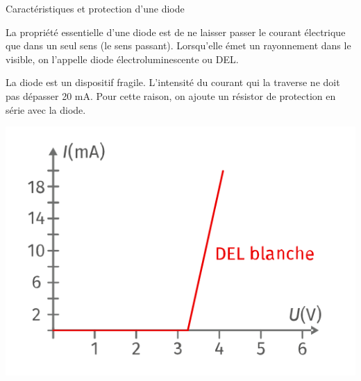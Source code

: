 \documentclass[10pt]{article}
\begin{document}
\begin{documentpeda}{Caractéristiques et protection d’une diode}
	\begin{minipage}[c]{0.75\textwidth}
		La propriété essentielle
		d’une diode est de ne laisser passer le courant électrique
		que dans un seul sens (le sens passant). Lorsqu’elle émet un
		rayonnement dans le visible, on l’appelle diode électroluminescente ou DEL.

		La diode est un dispositif fragile. L’intensité du courant qui la traverse ne doit pas dépasser 20 mA.
		Pour cette raison, on ajoute un résistor de protection en série avec la diode.
	\end{minipage}
	\begin{minipage}[c]{0.26\textwidth}
		\begin{center}
			\includegraphics[width=\columnwidth]{carac.png}
		\end{center}
	\end{minipage}
\end{documentpeda}

\vspace{-10pt}
\end{document}
